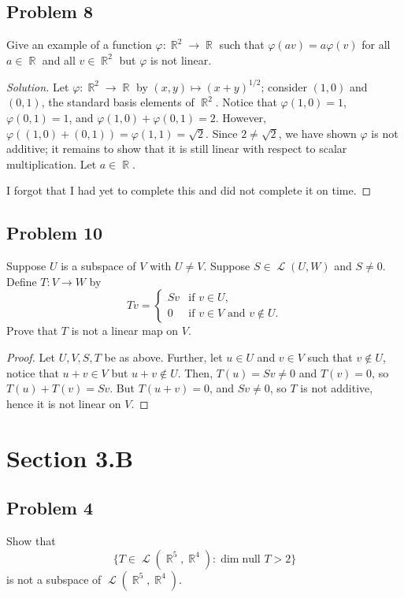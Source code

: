\documentclass[letterpaper, 12pt]{amsart}
\DeclareMathOperator{\R}{\mathbb{R}}				%
\DeclareMathOperator{\Ell}{\mathscr{L}}				%
\renewcommand{\null}{\text{null }}					%
\theoremstyle{definition}  							%
\begin{document}
		\subsection*{Problem 8}
		Give an example of a function $\varphi : \R^{2} \to \R$ such that $\varphi(av) = a\varphi(v)$ for all $a \in \R$ and all $v \in \R^{2}$ but $\varphi$ is not linear.

		\begin{proof}[Solution]
		Let $\varphi : \R^{2} \to \R$ by $(x,y) \mapsto (x + y)^{1/2}$; consider $(1,0)$ and $(0,1)$, the standard basis elements of $\R^{2}$.
		Notice that $\varphi(1,0) = 1$, \ $\varphi(0,1) = 1$, and $\varphi(1,0) + \varphi(0,1) = 2$.
		However, $\varphi((1,0) + (0,1)) = \varphi(1,1) = \sqrt{2}$.
		Since $2 \neq \sqrt{2}$, we have shown $\varphi$ is not additive; it remains to show that it is still linear with respect to scalar multiplication.
		Let $a \in \R$.

		I forgot that I had yet to complete this and did not complete it on time.
		\end{proof}

		\subsection*{Problem 10}
		Suppose $U$ is a subspace of $V$ with $U \neq V$.
		Suppose $S \in \Ell(U,W)$ and $S \neq 0$.
		Define $T : V \to W$ by $$Tv = \begin{cases} Sv & \text{if $v \in U$}, \\ 0 & \text{if $v \in V$ and $v \notin U$}. \end{cases}$$
		Prove that $T$ is not a linear map on $V$.

		\begin{proof}
		Let $U,V,S,T$ be as above.
		Further, let $u \in U$ and $v \in V$ such that $v \notin U$, notice that $u+v \in V$ but $u+v \notin U$.
		Then, $T(u) = Sv \neq 0$ and $T(v) = 0$, so $T(u) + T(v) = Sv$.
		But $T(u+v) = 0$, and $Sv \neq 0$, so $T$ is not additive, hence it is not linear on $V$.
		\end{proof}

	\section*{Section 3.B}
		\subsection*{Problem 4}
		Show that $$\{ T \in \Ell(\R^{5}, \R^{4}) : \dim \null T > 2 \}$$ is not a subspace of $\Ell(\R^{5}, \R^{4})$.
\end{document}
